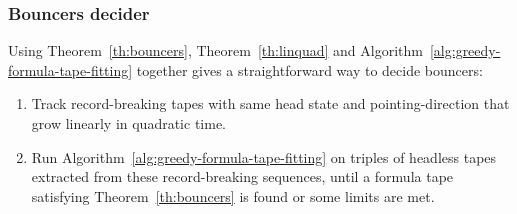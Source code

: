 



\subsubsection{Bouncers decider}

Using Theorem~\ref{th:bouncers}, Theorem~\ref{th:linquad} and Algorithm~\ref{alg:greedy-formula-tape-fitting} together gives a straightforward way to decide bouncers:

\begin{enumerate}
    \item Track record-breaking tapes with same head state and pointing-direction that grow linearly in quadratic time.
    \item Run Algorithm~\ref{alg:greedy-formula-tape-fitting} on triples of headless tapes extracted from these record-breaking sequences, until a formula tape satisfying Theorem~\ref{th:bouncers} is found or some limits are met.


\end{enumerate}


